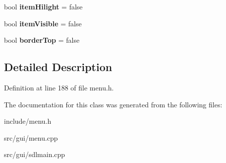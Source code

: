 \begin{DoxyCompactItemize}
\item 
\hypertarget{classDOSBoxMenu_1_1item_a2b8eab8d5482b72838f3282c902ebfe2}{bool {\bfseries item\-Hilight} = false}\label{classDOSBoxMenu_1_1item_a2b8eab8d5482b72838f3282c902ebfe2}

\item 
\hypertarget{classDOSBoxMenu_1_1item_a2c014c3c82d5539dcb01c81adac12bee}{bool {\bfseries item\-Visible} = false}\label{classDOSBoxMenu_1_1item_a2c014c3c82d5539dcb01c81adac12bee}

\item 
\hypertarget{classDOSBoxMenu_1_1item_a67eac7d4b03df9509fd907343577c6c5}{bool {\bfseries border\-Top} = false}\label{classDOSBoxMenu_1_1item_a67eac7d4b03df9509fd907343577c6c5}

\end{DoxyCompactItemize}


\subsection{Detailed Description}


Definition at line 188 of file menu.\-h.



The documentation for this class was generated from the following files\-:\begin{DoxyCompactItemize}
\item 
include/menu.\-h\item 
src/gui/menu.\-cpp\item 
src/gui/sdlmain.\-cpp\end{DoxyCompactItemize}
